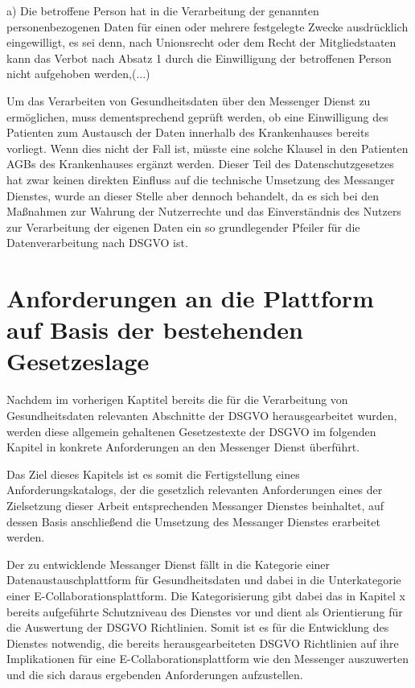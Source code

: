 a) Die betroffene Person hat in die Verarbeitung der genannten personenbezogenen Daten für einen oder mehrere festgelegte Zwecke ausdrücklich eingewilligt, es sei denn, nach Unionsrecht oder dem Recht der Mitgliedstaaten kann das Verbot nach Absatz 1 durch die Einwilligung der betroffenen Person nicht aufgehoben werden,(...)

Um das Verarbeiten von Gesundheitsdaten über den Messenger Dienst zu ermöglichen, muss dementsprechend geprüft werden, ob eine Einwilligung des Patienten zum Austausch der Daten innerhalb des Krankenhauses bereits vorliegt. Wenn dies nicht der Fall ist, müsste eine solche Klausel in den Patienten AGBs des Krankenhauses ergänzt werden. Dieser Teil des Datenschutzgesetzes hat zwar keinen direkten Einfluss auf die technische Umsetzung des Messanger Dienstes, wurde an dieser Stelle aber dennoch behandelt, da es sich bei den Maßnahmen zur Wahrung der Nutzerrechte und das Einverständnis des Nutzers zur Verarbeitung der eigenen Daten ein so grundlegender Pfeiler für die Datenverarbeitung nach DSGVO ist.

\section{Anforderungen an die Plattform auf Basis der bestehenden Gesetzeslage}\label{section:aadpabsbg}
Nachdem im vorherigen Kaptitel bereits die für die Verarbeitung von Gesundheitsdaten relevanten Abschnitte der DSGVO herausgearbeitet wurden, werden diese allgemein gehaltenen Gesetzestexte der DSGVO im folgenden Kapitel in konkrete Anforderungen an den Messenger Dienst überführt. 

Das Ziel dieses Kapitels ist es somit die Fertigstellung eines Anforderungskatalogs, der die gesetzlich relevanten Anforderungen eines der Zielsetzung dieser Arbeit entsprechenden Messanger Dienstes beinhaltet, auf dessen Basis anschließend die Umsetzung des Messanger Dienstes erarbeitet werden.

Der zu entwicklende Messanger Dienst fällt in die Kategorie einer Datenaustauschplattform für Gesundheitsdaten und dabei in die Unterkategorie einer E-Collaborationsplattform. Die Kategorisierung gibt dabei das in Kapitel x bereits aufgeführte Schutzniveau des Dienstes vor und dient als Orientierung für die Auswertung der DSGVO Richtlinien. Somit ist es für die Entwicklung des Dienstes notwendig, die bereits herausgearbeiteten DSGVO Richtlinien auf ihre Implikationen für eine E-Collaborationsplattform wie den Messenger auszuwerten und die sich daraus ergebenden Anforderungen aufzustellen. 

